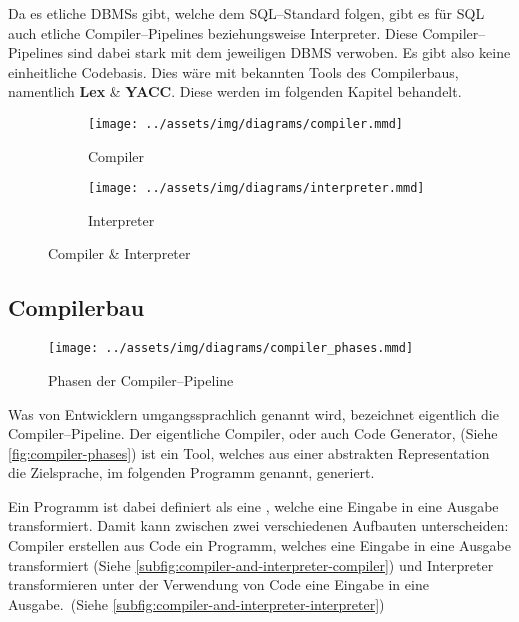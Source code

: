 Da es etliche \acp{DBMS} gibt, welche dem \ac{SQL}--Standard folgen, gibt es für \ac{SQL} auch etliche Compiler--Pipelines beziehungsweise Interpreter.
Diese Compiler--Pipelines sind dabei stark mit dem jeweiligen \ac{DBMS} verwoben.
Es gibt also keine einheitliche Codebasis.
Dies wäre mit bekannten Tools des Compilerbaus, namentlich \textbf{Lex} \& \textbf{YACC}.
Diese werden im folgenden Kapitel behandelt.

\begin{figure}[ht]
    \begin{subfigure}[c]{0.5\textwidth}
        \begin{center}
            \texttt{[image: ../assets/img/diagrams/compiler.mmd]}
        \end{center}
        \caption{Compiler}
        \label{subfig:compiler-and-interpreter-compiler}
    \end{subfigure}
    \begin{subfigure}[c]{0.5\textwidth}
        \begin{center}
            \texttt{[image: ../assets/img/diagrams/interpreter.mmd]}
        \end{center}
        \caption{Interpreter}
        \label{subfig:compiler-and-interpreter-interpreter}
    \end{subfigure}
    \caption{Compiler \& Interpreter~\autocite{aho-2006}}
    \label{fig:compiler-and-interpreter}
\end{figure}
\newpage

\subsection{Compilerbau}\label{subsec:compilerbau}
\begin{wrapfigure}{rH}{0.5\textwidth}
    \begin{center}
        \texttt{[image: ../assets/img/diagrams/compiler\_phases.mmd]}
    \end{center}
    \caption{Phasen der Compiler--Pipeline~\autocite{aho-2006}}
    \label{fig:compiler-phases}
\end{wrapfigure}
Was von Entwicklern umgangssprachlich  genannt wird, bezeichnet eigentlich die Compiler--Pipeline.
Der eigentliche Compiler, oder auch Code Generator, (Siehe \autoref{fig:compiler-phases}) ist ein Tool, welches aus einer abstrakten Representation die Zielsprache, im folgenden Programm genannt, generiert.

Ein Programm ist dabei definiert als eine , welche eine Eingabe in eine Ausgabe transformiert.
Damit kann zwischen zwei verschiedenen Aufbauten unterscheiden: Compiler erstellen aus Code ein Programm, welches eine Eingabe in eine Ausgabe transformiert (Siehe \autoref{subfig:compiler-and-interpreter-compiler}) und Interpreter transformieren unter der Verwendung von Code eine Eingabe in eine Ausgabe.~(Siehe \autoref{subfig:compiler-and-interpreter-interpreter})

